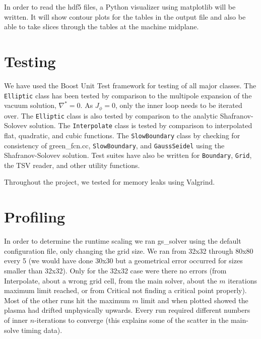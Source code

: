 \documentclass[paper=letter, fontsize=11pt]{scrartcl} %
\begin{document}
In order to read the hdf5 files, a Python visualizer using matplotlib will be written. It will show contour plots for the tables in the output file and also be able to take slices through the tables at the machine midplane.




\section{Testing}

We have used the Boost Unit Test framework for testing of all major classes. The \texttt{Elliptic} class has been tested by comparison to the multipole expansion of the vacuum solution, $\nabla^* = 0$. As $J_{\phi} = 0$, only the inner loop needs to be iterated over. The \texttt{Elliptic} class is also tested by comparison to the analytic Shafranov-Solovev solution. The \texttt{Interpolate} class is tested by comparison to interpolated flat, quadratic, and cubic functions. The \texttt{SlowBoundary} class by checking for consistency of green\_fcn.cc, \texttt{SlowBoundary}, and \texttt{GaussSeidel} using the Shafranov-Solovev solution. Test suites have also be written for \texttt{Boundary}, \texttt{Grid}, the TSV reader, and other utility functions.

Throughout the project, we tested for memory leaks using Valgrind.


\section{Profiling}

In order to determine the runtime scaling we ran gs\_solver using the default configuration file, only changing the grid size. We ran from 32x32 through 80x80 every 5 (we would have done 30x30 but a geometrical error occurred for sizes smaller than 32x32). Only for the 32x32 case were there no errors (from Interpolate, about a wrong grid cell, from the main solver, about the $m$ iterations maximum limit reached, or from Critical not finding a critical point properly). Most of the other runs hit the maximum $m$ limit and when plotted showed the plasma had drifted unphysically upwards. Every run required different numbers of inner $n$-iterations to converge (this explains some of the scatter in the main-solve timing data).
\end{document}
